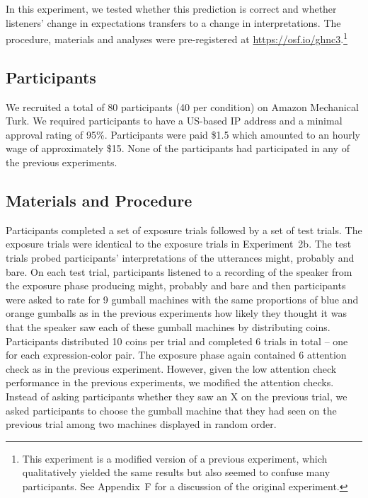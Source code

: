 \documentclass[man, floatsintext]{apa6}
\begin{document}
In this experiment, we tested whether this prediction is correct and whether listeners' change in expectations transfers to a change in interpretations. 
The procedure, materials and analyses were pre-registered at \url{https://osf.io/ghnc3}.\footnote{This experiment is a modified version of a previous experiment, which qualitatively yielded the same results but also seemed to confuse many participants. See Appendix~F for a discussion of the original experiment.}

\subsection{Participants}

We recruited a total of 80 participants (40 per condition) on Amazon Mechanical Turk. We required participants to have a US-based IP address and a minimal approval rating of 95\%. Participants were paid \$1.5 which amounted to an hourly wage of approximately \$15. None of the participants had participated in any of the previous experiments. 

\subsection{Materials and Procedure}

Participants completed a set of exposure trials followed by a set of test trials. The exposure trials were identical to the exposure trials in Experiment~2b. The test trials probed participants' interpretations of the utterances {\sc might}, {\sc probably} and {\sc bare}. On each test trial, participants listened to a recording of the speaker from the exposure phase producing {\sc might}, {\sc probably} and {\sc bare} and then participants were asked to rate for 9 gumball machines with the same proportions of blue and orange gumballs as in the previous experiments how likely they thought it was that the speaker saw each of these gumball machines by distributing coins.  Participants distributed 10 coins per trial and completed 6 trials in total  -- one for each expression-color pair. The exposure phase again contained  6 attention check as in the previous experiment. However, given the low attention check performance in the previous experiments, we modified the attention checks. Instead of asking participants whether they saw an X on the previous trial, we asked participants to choose the gumball machine that they had seen on the previous trial among two machines displayed in random order.
\end{document}
